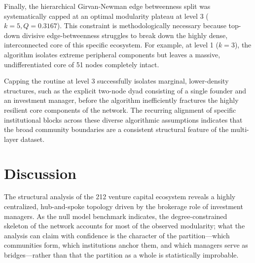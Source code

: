 \documentclass[conference]{IEEEtran}
\begin{document}
Finally, the hierarchical Girvan-Newman edge betweenness split was systematically capped at an optimal modularity plateau at level 3 ($k=5, Q = 0.3167$). This constraint is methodologically necessary because top-down divisive edge-betweenness struggles to break down the highly dense, interconnected core of this specific ecosystem. For example, at level 1 ($k=3$), the algorithm isolates extreme peripheral components but leaves a massive, undifferentiated core of 51 nodes completely intact. 

Capping the routine at level 3 successfully isolates marginal, lower-density structures, such as the explicit two-node dyad consisting of a single founder and an investment manager, before the algorithm inefficiently fractures the highly resilient core components of the network. The recurring alignment of specific institutional blocks across these diverse algorithmic assumptions indicates that the broad community boundaries are a consistent structural feature of the multi-layer dataset.

\section{Discussion}

The structural analysis of the 212 venture capital ecosystem reveals a highly centralized, hub-and-spoke topology driven by the brokerage role of investment managers. As the null model benchmark indicates, the degree-constrained skeleton of the network accounts for most of the observed modularity; what the analysis can claim with confidence is the character of the partition—which communities form, which institutions anchor them, and which managers serve as bridges—rather than that the partition as a whole is statistically improbable.
\end{document}
